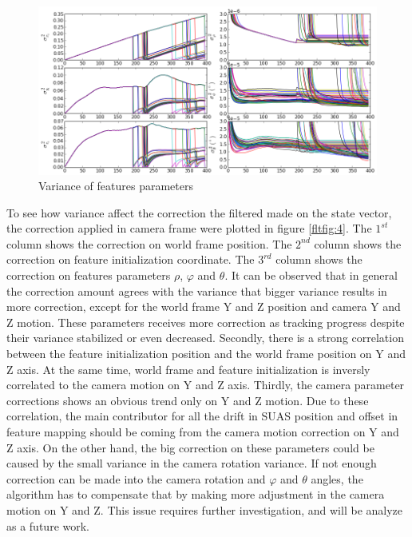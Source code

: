 \begin{figure}[h]
\centering
\includegraphics[width=14cm, keepaspectratio=true]
{./Figures/fltfig/cut1/Figure40.png}
\caption{Variance of features parameters}
\label{fltfig:3}
\end{figure}
\FloatBarrier

To see how variance affect the correction the filtered made on the
state vector, the correction applied in camera frame were plotted in
figure \ref{fltfig:4}. The $1^{st}$ column shows the correction on
world frame position. The $2^{nd}$ column shows the correction on
feature initialization coordinate. The $3^{rd}$ column shows the
correction on features parameters $\rho$, $\varphi$ and $\theta$. It
can be observed that in general the correction amount agrees with the
variance that bigger variance results in more correction, except for
the world frame Y and Z position and camera Y and Z motion. These
parameters receives more correction as tracking progress despite their
variance stabilized or even decreased. Secondly, there is a strong
correlation between the feature initialization position and the world
frame position on Y and Z axis. At the same time, world frame and
feature initialization is inversly correlated to the camera motion on
Y and Z axis. Thirdly, the camera parameter corrections shows an
obvious trend only on Y and Z motion. Due to these correlation, the
main contributor for all the drift in SUAS position and offset in
feature mapping should be coming from the camera motion correction on
Y and Z axis. On the other hand, the big correction on these
parameters could be caused by the small variance in the camera
rotation variance. If not enough correction can be made into the
camera rotation and $\varphi$ and $\theta$ angles, the algorithm has
to compensate that by making more adjustment in the camera motion on Y
and Z. This issue requires further investigation, and will be analyze as a
future work.

